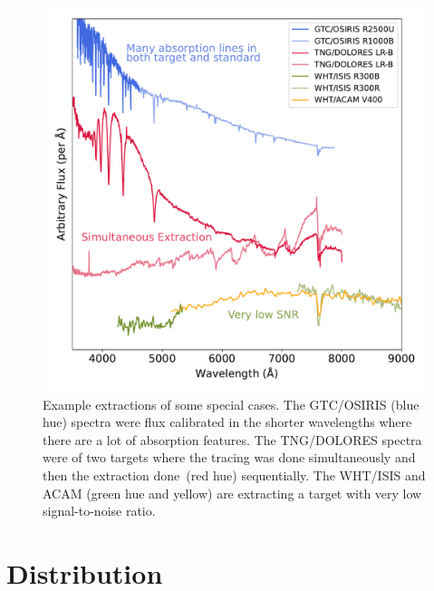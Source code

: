 \documentclass[linenumbers, twocolumn]{aastex631}
\begin{document}
\begin{figure}
    \centering
    \includegraphics[width=\textwidth]{fig_09_use_case_plots.pdf}
    \caption{Example extractions of some special cases. The GTC/OSIRIS (blue hue)
    spectra were flux calibrated in the shorter wavelengths where there are a lot
    of absorption features. The TNG/DOLORES spectra were of two targets where the
    tracing was done simultaneously and then the extraction done~(red hue)
    sequentially. The WHT/ISIS and ACAM (green hue and yellow) are extracting a
    target with very low signal-to-noise ratio.}
    \label{fig:use_cases}
\end{figure}

\section{Distribution}
\label{sec:distribution}
\end{document}
